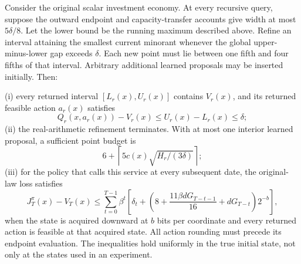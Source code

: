 \begin{theorem}\label{thm:query63}
Consider the original scalar investment economy. At every recursive query, suppose the outward endpoint and capacity-transfer accounts give width at most $5\delta/8$. Let the lower bound be the running maximum described above. Refine an interval attaining the smallest current minorant whenever the global upper-minus-lower gap exceeds $\delta$. Each new point must lie between one fifth and four fifths of that interval. Arbitrary additional learned proposals may be inserted initially. Then:

(i) every returned interval $[L_r(x),U_r(x)]$ contains $V_r(x)$, and its returned feasible action $a_r(x)$ satisfies
\[
 Q_r(x,a_r(x))-V_r(x)\le U_r(x)-L_r(x)\le\delta;
\]
(ii) the real-arithmetic refinement terminates. With at most one interior learned proposal, a sufficient point budget is
\begin{equation}\label{eq:querycap63}
 6+\left\lceil5c(x)\sqrt{H_r/(3\delta)}\right\rceil;
\end{equation}
(iii) for the policy that calls this service at every subsequent date, the original-law loss satisfies
\begin{equation}\label{eq:querypolicy63}
 J_T^{\pi}(x)-V_T(x)
 \le\sum_{t=0}^{T-1}\beta^t
 \left[\delta_t+
 \left(8+\frac{11\beta dG_{T-t-1}}{16}
                  +dG_{T-t}\right)2^{-b}\right],
\end{equation}
when the state is acquired downward at $b$ bits per coordinate and every returned action is feasible at that acquired state. All action rounding must precede its endpoint evaluation. The inequalities hold uniformly in the true initial state, not only at the states used in an experiment.
\end{theorem}

